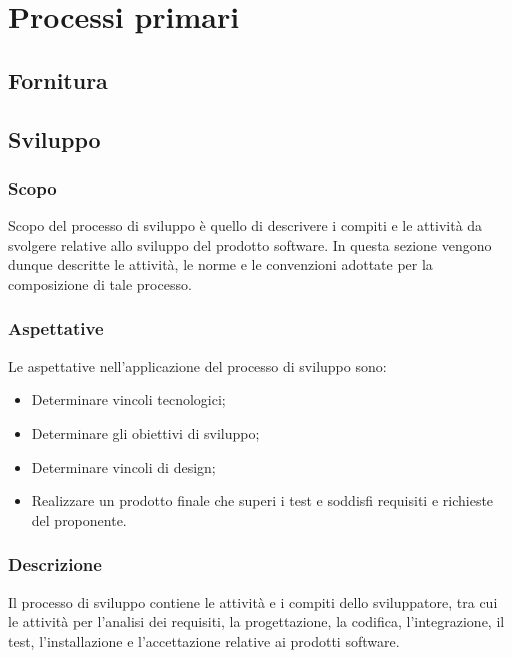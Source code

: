 \setcounter{secnumdepth}{5}
\makeatletter
\renewcommand\subparagraph{
\@startsection {subparagraph}{5}{0mm}{-\baselineskip}{.5\baselineskip}{\normalfont \normalsize \bfseries }}
\makeatother

\section{Processi primari}\label{section:processi_primari}
\subsection{Fornitura}

\subsection{Sviluppo}
    \subsubsection{Scopo}
    Scopo del processo di sviluppo è quello di descrivere i compiti e le attività da svolgere relative allo sviluppo del prodotto software.
    In questa sezione vengono dunque descritte le attività, le norme e le convenzioni adottate per la composizione di tale processo.

    \subsubsection{Aspettative}
    Le aspettative nell’applicazione del processo di sviluppo sono:
    \begin{itemize}
        \item Determinare vincoli tecnologici;
        \item Determinare gli obiettivi di sviluppo;
        \item Determinare vincoli di design;
        \item Realizzare un prodotto finale che superi i test e soddisfi requisiti e richieste del proponente.
    \end{itemize}

    \subsubsection{Descrizione}
    Il processo di sviluppo contiene le attività e i compiti dello sviluppatore, tra cui le attività per l’analisi dei requisiti, la progettazione, 
    la codifica, l’integrazione, il test, l’installazione e l’accettazione relative ai prodotti software.

